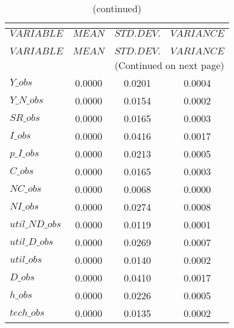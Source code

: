  
\begin{center}
\begin{longtable}{lccc} 
\caption{THEORETICAL MOMENTS}\\
 \label{Table:th_moments}\\
\toprule 
$VARIABLE       $	 & 	 $         MEAN$	 & 	 $    STD. DEV.$	 & 	 $     VARIANCE$\\
\midrule \endfirsthead 
\caption{(continued)}\\
 \toprule \\ 
$VARIABLE       $	 & 	 $         MEAN$	 & 	 $    STD. DEV.$	 & 	 $     VARIANCE$\\
\midrule \endhead 
\midrule \multicolumn{4}{r}{(Continued on next page)} \\ \bottomrule \endfoot 
\bottomrule \endlastfoot 
$Y\_obs         $	 & 	       0.0000	 & 	       0.0201	 & 	       0.0004 \\ 
$Y\_N\_obs      $	 & 	       0.0000	 & 	       0.0154	 & 	       0.0002 \\ 
$SR\_obs        $	 & 	       0.0000	 & 	       0.0165	 & 	       0.0003 \\ 
$I\_obs         $	 & 	       0.0000	 & 	       0.0416	 & 	       0.0017 \\ 
$p\_I\_obs      $	 & 	       0.0000	 & 	       0.0213	 & 	       0.0005 \\ 
$C\_obs         $	 & 	       0.0000	 & 	       0.0165	 & 	       0.0003 \\ 
$NC\_obs        $	 & 	       0.0000	 & 	       0.0068	 & 	       0.0000 \\ 
$NI\_obs        $	 & 	       0.0000	 & 	       0.0274	 & 	       0.0008 \\ 
$util\_ND\_obs  $	 & 	       0.0000	 & 	       0.0119	 & 	       0.0001 \\ 
$util\_D\_obs   $	 & 	       0.0000	 & 	       0.0269	 & 	       0.0007 \\ 
$util\_obs      $	 & 	       0.0000	 & 	       0.0140	 & 	       0.0002 \\ 
$D\_obs         $	 & 	       0.0000	 & 	       0.0410	 & 	       0.0017 \\ 
$h\_obs         $	 & 	       0.0000	 & 	       0.0226	 & 	       0.0005 \\ 
$tech\_obs      $	 & 	       0.0000	 & 	       0.0135	 & 	       0.0002 \\ 
\end{longtable}
 \end{center}
